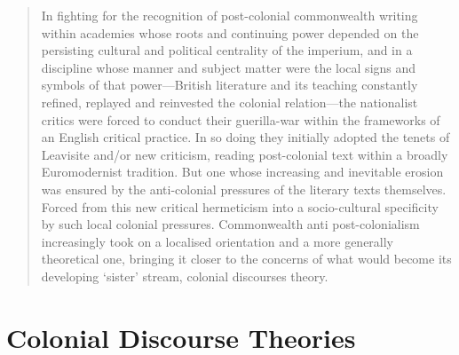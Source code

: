 \begin{quote}
    In  fighting  for  the  recognition  of  post-colonial  commonwealth  writing  within  academies  whose  roots  and  continuing  power  depended  on  the  persisting  cultural  and  political  centrality  of  the  imperium,  and  in  a  discipline  whose  manner  and  subject  matter  were  the  local  signs  and  symbols  of  that  power—British  literature  and  its  teaching  constantly  refined,  replayed  and  reinvested  the  colonial  relation—the  nationalist  critics  were  forced  to  conduct  their  guerilla-war  within  the  frameworks  of  an  English  critical  practice.  In  so  doing  they  initially  adopted  the  tenets  of  Leavisite  and/or  new  criticism,  reading  post-colonial  text  within  a  broadly  Euromodernist  tradition.  But  one  whose  increasing  and  inevitable  erosion  was  ensured  by  the  anti-colonial  pressures  of  the  literary  texts  themselves.  Forced  from  this  new  critical  hermeticism  into  a  socio-cultural  specificity  by  such  local  colonial  pressures.  Commonwealth  anti  post-colonialism  increasingly  took  on  a  localised  orientation  and  a  more  generally  theoretical  one,  bringing  it  closer  to  the  concerns  of  what  would  become  its  developing  ‘sister’  stream,  colonial  discourses  theory. \parencite[p.~53--54]{Ashcroft}
\end{quote}

\section{Colonial Discourse Theories}

